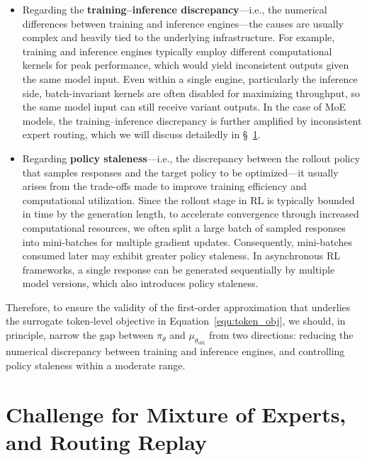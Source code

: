 \documentclass{article}
\begin{document}
\begin{itemize}[leftmargin=10mm, itemsep=2mm]

\item Regarding the \textbf{training–inference discrepancy}—i.e., the numerical differences between training and inference engines—the causes are usually complex and heavily tied to the underlying infrastructure. 
For example, training and inference engines typically employ different computational kernels for peak performance, which would yield inconsistent outputs given the same model input.
Even within a single engine, particularly the inference side, batch-invariant kernels \citep{he2025nondeterminism} are often disabled for maximizing throughput, so the same model input can still receive variant outputs.
In the case of MoE models, the training–inference discrepancy is further amplified by inconsistent expert routing, which we will discuss detailedly in \S~\ref{sec:moe}.

\item Regarding \textbf{policy staleness}—i.e., the discrepancy between the rollout policy that samples responses and the target policy to be optimized—it usually arises from the trade-offs made to improve training efficiency and computational utilization.
Since the rollout stage in RL is typically bounded in time by the generation length, to accelerate convergence through increased computational resources, we often split a large batch of sampled responses into mini-batches for multiple gradient updates.
Consequently, mini-batches consumed later may exhibit greater policy staleness.
In asynchronous RL frameworks, a single response can be generated sequentially by multiple model versions, which also introduces policy staleness.

\end{itemize}

Therefore, to ensure the validity of the first-order approximation that underlies the surrogate token-level objective in Equation~\eqref{equ:token_obj}, we should, in principle, narrow the gap between \( \pi_\theta \) and \( \mu_{ \theta_\text{old} } \) from two directions: {reducing the numerical discrepancy between training and inference engines}, and {controlling policy staleness within a moderate range}.

\section{Challenge for Mixture of Experts, and Routing Replay}
\label{sec:moe}
\end{document}
